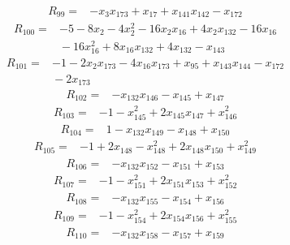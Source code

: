 {%
\begin{align*}
R_{99} ={}& -x_{3} x_{173} + x_{17} + x_{141} x_{142} - x_{172}
\end{align*}
\begin{align*}
R_{100} ={}& -5 - 8x_{2} - 4x_{2}^{2} - 16x_{2} x_{16} + 4x_{2} x_{132} - 16x_{16} \\
&{}  - 16x_{16}^{2} + 8x_{16} x_{132} + 4x_{132} - x_{143}
\end{align*}
\begin{align*}
R_{101} ={}& -1 - 2x_{2} x_{173} - 4x_{16} x_{173} + x_{95} + x_{143} x_{144} - x_{172} \\
&{}  - 2x_{173}
\end{align*}
\begin{align*}
R_{102} ={}& -x_{132} x_{146} - x_{145} + x_{147}
\end{align*}
\begin{align*}
R_{103} ={}& -1 - x_{145}^{2} + 2x_{145} x_{147} + x_{146}^{2}
\end{align*}
\begin{align*}
R_{104} ={}& 1 - x_{132} x_{149} - x_{148} + x_{150}
\end{align*}
\begin{align*}
R_{105} ={}& -1 + 2x_{148} - x_{148}^{2} + 2x_{148} x_{150} + x_{149}^{2}
\end{align*}
\begin{align*}
R_{106} ={}& -x_{132} x_{152} - x_{151} + x_{153}
\end{align*}
\begin{align*}
R_{107} ={}& -1 - x_{151}^{2} + 2x_{151} x_{153} + x_{152}^{2}
\end{align*}
\begin{align*}
R_{108} ={}& -x_{132} x_{155} - x_{154} + x_{156}
\end{align*}
\begin{align*}
R_{109} ={}& -1 - x_{154}^{2} + 2x_{154} x_{156} + x_{155}^{2}
\end{align*}
\begin{align*}
R_{110} ={}& -x_{132} x_{158} - x_{157} + x_{159}

\end{align*}}
